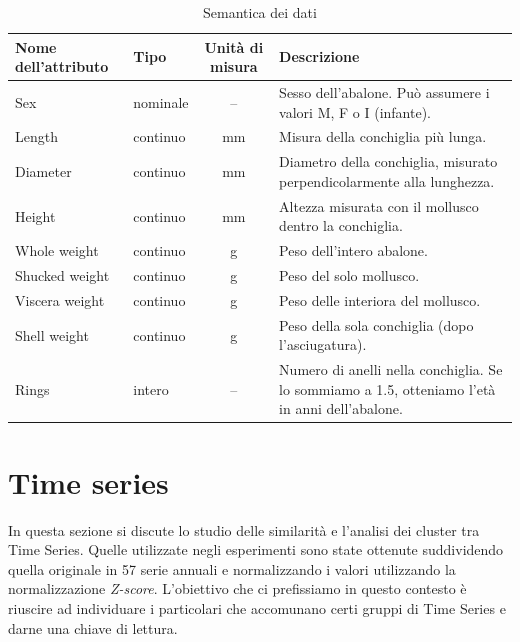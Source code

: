 \documentclass[a4paper]{article}
\begin{document}
\begin{table}[h]
\centering


\begingroup
\setlength{\tabcolsep}{8pt} %
\renewcommand{\arraystretch}{1.4} %
\begin{tabularx}{\textwidth}{|llcX|}
\hline
\textbf{Nome dell'attributo} & \textbf{Tipo}                                                              & \textbf{Unità di misura} & \textbf{Descrizione}\\\hline

Sex & nominale & -- & Sesso dell'abalone. Può assumere i valori M, F o I (infante). \\

Length & continuo & mm & Misura della conchiglia più lunga. \\
Diameter & continuo & mm & Diametro della conchiglia, misurato perpendicolarmente alla lunghezza. \\
Height & continuo & mm & Altezza misurata con il mollusco dentro la conchiglia. \\
Whole weight & continuo & g & Peso dell'intero abalone. \\
Shucked weight & continuo & g & Peso del solo mollusco. \\
Viscera weight & continuo & g & Peso delle interiora del mollusco. \\
Shell weight & continuo & g & Peso della sola conchiglia (dopo l'asciugatura). \\
Rings & intero & -- & Numero di anelli nella conchiglia. Se lo sommiamo a 1.5, otteniamo l'età in anni dell'abalone. \\

 \hline
\end{tabularx}
\endgroup
\caption{Semantica dei dati}
\label{tab:semantics}
\end{table}



\newpage

\section{Time series}


In questa sezione si discute lo studio delle similarità e l'analisi dei cluster tra Time Series. Quelle utilizzate negli esperimenti sono state ottenute suddividendo quella originale in 57 serie annuali e normalizzando i valori utilizzando la normalizzazione \textit{Z-score}. L'obiettivo che ci prefissiamo in questo contesto è riuscire ad individuare i particolari che accomunano certi gruppi di Time Series e darne una chiave di lettura.
\end{document}
